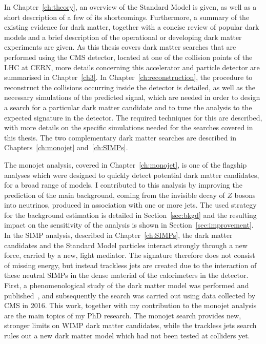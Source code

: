 In Chapter~\ref{ch:theory}, an overview of the Standard Model is given, as well as a short description of a few of its shortcomings. Furthermore, a summary of the existing evidence for dark matter, together with a concise review of popular dark models and a brief description of the operational or developing dark matter experiments are given. As this thesis covers dark matter searches that are performed using the \acs{CMS} detector, located at one of the collision points of the \acs{LHC} at \acs{CERN}, more details concerning this accelerator and particle detector are summarised in Chapter~\ref{ch3}. In Chapter~\ref{ch:reconstruction}, the procedure to reconstruct the collisions occurring inside the detector is detailed, as well as the necessary simulations of the predicted signal, which are needed in order to design a search for a particular dark matter candidate and to tune the analysis to the expected signature in the detector. The required techniques for this are described, with more details on the specific simulations needed for the searches covered in this thesis. The two complementary dark matter searches are described in Chapters~\ref{ch:monojet} and~\ref{ch:SIMPs}.

The monojet analysis, covered in Chapter~\ref{ch:monojet}, is one of the flagship analyses which were designed to quickly detect potential dark matter candidates, for a broad range of models. I contributed to this analysis by improving the prediction of the main background, coming from the invisible decay of $Z$ bosons into neutrinos, produced in association with one or more jets. The used strategy for the background estimation is detailed in Section~\ref{sec:bkgd} and the resulting impact on the sensitivity of the analysis is shown in Section~\ref{sec:improvement}. In the \ac{SIMP} analysis, described in Chapter~\ref{ch:SIMPs}, the dark matter candidates and the Standard Model particles interact strongly through a new force, carried by a new, light mediator. The signature therefore does not consist of missing energy, but instead trackless jets are created due to the interaction of these neutral \acsp{SIMP} in the dense material of the calorimeters in the detector. First, a phenomenological study of the dark matter model was performed and published~\cite{Daci:2015hca}, and subsequently the search was carried out using data collected by \acs{CMS} in 2016. This work, together with my contribution to the monojet analysis are the main topics of my PhD research. The monojet search provides new, stronger limits on \acs{WIMP} dark matter candidates, while the trackless jets search rules out a new dark matter model which had not been tested at colliders yet.

